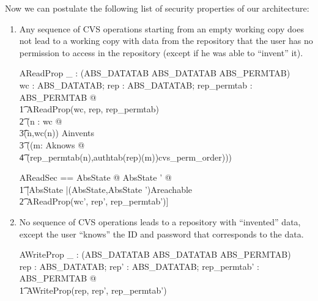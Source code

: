   Now we can postulate the following list of security
  properties of our architecture:
\begin{enumerate}
\item Any sequence of CVS operations starting from an empty working copy does
  not lead to a working copy with data from the repository that the user has no
  permission to access in the repository (except if he was able to ``invent''
  it).

%
%
%
\begin{doc}{3}
  \begin{axdef}
    AReadProp \_ : \power (ABS\_DATATAB \cross ABS\_DATATAB \cross ABS\_PERMTAB) \\
    \where \forall wc : ABS\_DATATAB; rep : ABS\_DATATAB; rep\_permtab :
    ABS\_PERMTAB @ \\
    \t1 AReadProp(wc, rep, rep\_permtab) \iff \\
    \t2 (\forall n : \dom wc @ \\
    \t3(n,wc(n)) \in Ainvents \lor \\
    \t3 ((\exists m: Aknows @ \\
    \t4 (rep\_permtab(n),authtab(rep)(m))\in cvs\_perm\_order)))\\
  \end{axdef}
\end{doc}
%
%
%
%  
\begin{zed}
    AReadSec == \forall AbsState @ \forall  AbsState ' @ \\
    \t1 [\Delta AbsState |(\theta AbsState,\theta AbsState ')\in Areachable \\
    \t2 \implies AReadProp(wc', rep', rep\_permtab')]\\
  \end{zed}
%
%
%
\item No sequence of CVS operations leads to a repository with ``invented''
  data, except the user ``knows'' the ID and password that corresponds to the
  data.
%
%
\begin{doc}{3}
  \begin{axdef}
    AWriteProp \_ : \power (ABS\_DATATAB \cross ABS\_DATATAB \cross ABS\_PERMTAB) \\
    \where \forall rep : ABS\_DATATAB; rep' : ABS\_DATATAB; rep\_permtab' :
    ABS\_PERMTAB @ \\
    \t1 AWriteProp(rep, rep', rep\_permtab') \iff \\

\end{axdef}
\end{doc}
\end{enumerate}
